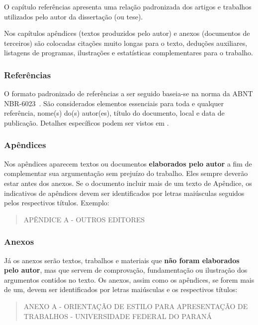 \documentclass[repeatfields,xlists,xpacks,oneside]{ufrgscca}
\begin{document}
O capítulo referências apresenta uma relação padronizada dos artigos e
trabalhos utilizados pelo autor da dissertação (ou tese).

Nos capítulos apêndices (textos produzidos pelo autor) e anexos (documentos
de terceiros) são colocadas citações muito longas para o texto, deduções
auxiliares, listagens de programas, ilustrações e estatísticas
complementares para o trabalho.

\subsubsection{Referências}
O formato padronizado de referências a ser seguido baseia-se na norma da ABNT
NBR-6023~\cite{ABNT:NBR-6023-2002}. São considerados
elementos essenciais para toda e qualquer referência, nome(s) do(s)
autor(es), título do documento, local e data de publicação. Detalhes específicos podem ser vistos em .


\subsubsection{Apêndices}

Nos apêndices aparecem textos ou documentos {\bf elaborados pelo autor}  a
fim de complementar sua argumentação sem prejuízo do trabalho. Eles sempre
deverão estar antes dos anexos. Se o documento incluir mais de um texto de
Apêndice, os indicativos de apêndices devem ser identificados por letras
maiúsculas seguidos pelos respectivos títulos. Exemplo:\\

\begin{quote}APÊNDICE A  - OUTROS EDITORES\\\end{quote}

\subsubsection{Anexos}

Já os anexos serão textos, trabalhos e materiais que {\bf não foram
elaborados pelo autor}, mas que servem de comprovação, fundamentação ou
ilustração dos argumentos contidos no texto. Os anexos, assim como os
apêndices, se forem mais de um, devem ser identificados por letras
maiúsculas e os respectivos títulos:\\

\begin{quote}ANEXO A - ORIENTAÇÃO DE ESTILO PARA APRESENTAÇÃO DE TRABALHOS - UNIVERSIDADE FEDERAL DO PARANÁ\\\end{quote}
\end{document}
